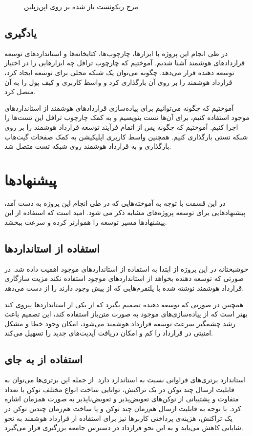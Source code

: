\begin{figure}[H]
\centerline{}
\caption{مرج ریکوئست باز شده بر روی اپن‌زپلین}
\label{fig:oz-mergereq}
\end{figure}


\subsection{یادگیری}
در طی انجام این پروژه با ابزارها، چارچوب‌ها، کتابخانه‌ها و استانداردهای توسعه قراردادهای هوشمند آشنا شدیم.
آموختیم که چارچوب ترافل چه ابزارهایی را در اختیار توسعه دهنده قرار می‌دهد.
چگونه می‌توان یک شبکه محلی برای توسعه ایجاد کرد،
قرارداد هوشمند را بر روی آن بارگذاری کرد و واسط کاربری و کیف پول را به آن متصل کرد.

آموختیم که چگونه می‌توانیم برای پیاده‌سازی قراردادهای هوشمند از استانداردهای موجود استفاده کنیم،
برای آن‌ها تست بنویسیم و به کمک چارچوب ترافل این تست‌ها را اجرا کنیم.
آموختیم که چگونه پس از اتمام فرآیند توسعه قرارداد هوشمند را بر روی شبکه تستی بارگذاری کنیم.
همچنین واسط کاربری اپلیکیشن به کمک صفحات گیت‌هاب بارگذاری و به قرارداد هوشمند روی شبکه تست متصل شد.


\section{پیشنهادها}
در این قسمت با توجه به آموخته‌هایی که در طی انجام این پروژه به دست آمد،
پیشنهادهایی برای توسعه پروژه‌های مشابه ذکر می شود.
امید است که استفاده از این پیشنهادها مسیر توسعه را هموارتر کرده و سرعت ببخشد.

\subsection{استفاده از استانداردها}
خوشبختانه در این پروژه از ابتدا به استفاده از استانداردهای موجود اهمیت داده شد.
در صورتی که توسعه دهنده بخواهد از استانداردهای موجود استفاده نکند مزیت سازگاری
قرارداد هوشمند نوشته شده با پلتفرم‌هایی که از پیش وجود دارند را از دست می‌دهد.

همچنین در صورتی که توسعه دهنده تصمیم بگیرد که از یکی از استانداردها پیروی کند
بهتر است که از پیاده‌سازی‌های موجود به صورت متن‌باز استفاده کند، این تصمیم باعث
رشد چشمگیر سرعت توسعه قرارداد هوشمند می‌شود، امکان وجود خطا و مشکل امنیتی در قرارداد را کم
و امکان دریافت آپدیت‌های جدید را تسهیل می‌کند.


\subsection{استفاده از  به جای }
استاندارد
برتری‌های فراوانی نسبت به استاندارد
دارد.
از جمله این برتری‌ها می‌توان به قابلیت ارسال چند توکن در یک تراکنش،
توانایی ساخت انواع مختلف توکن با تعداد متفاوت و
پشتیبانی از توکن‌های تعویض‌پذیر و تعویض‌ناپذیر به صورت همزمان اشاره کرد.
با توجه به قابلیت ارسال هم‌زمان چند توکن و یا ساخت هم‌زمان چندین توکن در یک تراکنش،
هزینه‌ی پرداختی کاربرها نیز
برای استفاده از قرارداد هوشمند به نحو شایانی کاهش می‌یابد و به این نحو قرارداد در دسترس
جامعه بزرگتری قرار می‌گیرد.

